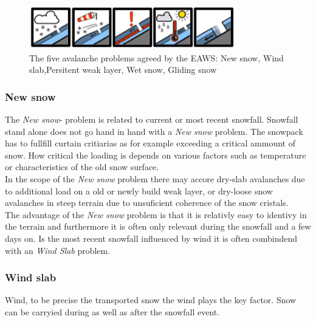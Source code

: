 \begin{figure}[h]
    \centering
    \includegraphics[width=0.8\textwidth]{Figures/figures_methods/avaprobs.png}
    \caption{The five avalanche problems agreed by the EAWS: New snow, Wind slab,Persitent weak layer, Wet snow, Gliding snow}
    \label{fig:avaprobs}
\end{figure}

\subsubsection{New snow}

The \textit{New snow}- problem is related to current or most recent snowfall.
Snowfall stand alone does not go hand in hand with a \textit{New snow} problem.
The snowpack has to fullfill curtain critiarias as for example exceeding a critical ammount of snow. 
How critical the loading is depends on various factors such as temperature or characteristics of the old snow surface. 
\cite{mittererAusbildungshandbuchTirolerLawinenkommissionen2022} \\

\noindent In the scope of the \textit{New snow} problem there may accore dry-slab avalanches due to additional load on a old or newly 
build weak layer, or dry-loose snow avalanches in steep terrain due to unsuficient coherence of the snow cristals. 
\\
\noindent The advantage of the \textit{New snow} problem is that it is relativly easy to identivy in the terrain and 
furthermore it is often only relevant during the snowfall and a few days on. Is the most recent snowfall influenced 
by wind it is often combindend with an \textit{Wind Slab}  problem.\cite{mittererAusbildungshandbuchTirolerLawinenkommissionen2022}


\subsubsection{Wind slab}

Wind, to be precise the transported snow the wind plays the key factor. Snow can be carryied during as well as after the snowfall event. 

